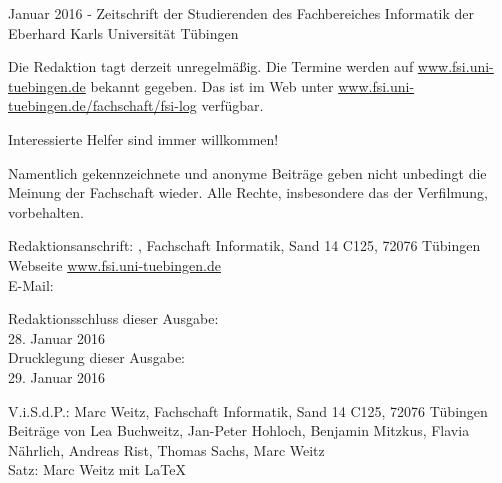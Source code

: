 \nameit \space \space Januar 2016 - Zeitschrift der Studierenden des Fachbereiches Informatik der Eberhard Karls Universität Tübingen

Die Redaktion tagt derzeit unregelmäßig. Die Termine werden auf \url{www.fsi.uni-tuebingen.de} bekannt  gegeben.  Das  \nameit \space ist  im  Web  unter \url{www.fsi.uni-tuebingen.de/fachschaft/fsi-log}  verfügbar.

Interessierte Helfer sind immer willkommen!

Namentlich gekennzeichnete und anonyme Beiträge geben nicht unbedingt die Meinung der Fachschaft wieder. Alle Rechte, insbesondere das der Verfilmung, vorbehalten.

Redaktionsanschrift:
\nameit, Fachschaft Informatik, Sand 14 C125, 72076 Tübingen\\
Webseite \url{www.fsi.uni-tuebingen.de}\\
E-Mail:

Redaktionsschluss dieser Ausgabe:\\
28. Januar 2016\\
Drucklegung dieser Ausgabe:\\
29. Januar 2016

V.i.S.d.P.: Marc Weitz, Fachschaft Informatik, Sand 14 C125, 72076 Tübingen\\
Beiträge von Lea Buchweitz, Jan-Peter Hohloch, Benjamin Mitzkus, Flavia Nährlich, Andreas Rist, Thomas Sachs, Marc Weitz\\
Satz: Marc Weitz mit \LaTeX 


